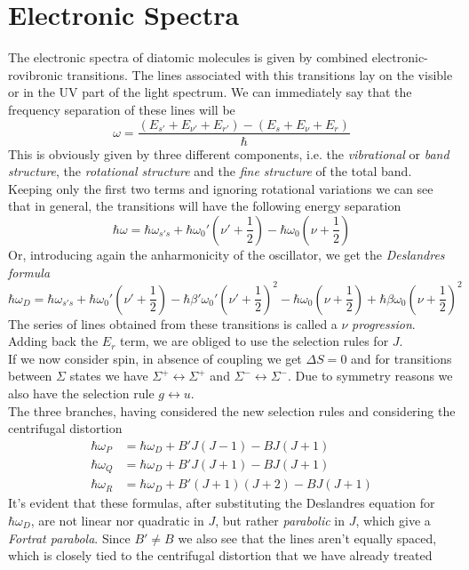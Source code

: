 \documentclass[../qm.tex]{subfiles}
\begin{document}
	\section{Electronic Spectra}
	The electronic spectra of diatomic molecules is given by combined electronic-rovibronic transitions. The lines associated with this transitions lay on the visible or in the UV part of the light spectrum. We can immediately say that the frequency separation of these lines will be
	\begin{equation}
		\omega=\frac{(E_{s'}+E_{\nu'}+E_{r'})-(E_s+E_\nu+E_r)}{\hbar}
		\label{eqelectronicspectra}
	\end{equation}
	This is obviously given by three different components, i.e. the \textit{vibrational} or \textit{band structure}, the \textit{rotational structure} and the \textit{fine structure} of the total band.\\
	Keeping only the first two terms and ignoring rotational variations we can see that in general, the transitions will have the following energy separation
	\begin{equation}
		\hbar\omega=\hbar\omega_{s's}+\hbar\omega_0'\left( \nu'+\frac{1}{2} \right)-\hbar\omega_0\left( \nu+\frac{1}{2} \right)
		\label{eq:electronicspectranorotation}
	\end{equation}
	Or, introducing again the anharmonicity of the oscillator, we get the \textit{Deslandres formula}
	\begin{equation}
		\hbar\omega_D=\hbar\omega_{s's}+\hbar\omega_0'\left( \nu'+\frac{1}{2} \right)-\hbar\beta'\omega_0'\left( \nu'+\frac{1}{2} \right)^2-\hbar\omega_0\left( \nu+\frac{1}{2} \right)+\hbar\beta\omega_0\left( \nu+\frac{1}{2} \right)^2
		\label{eq:Deslandresformula}
	\end{equation}
	The series of lines obtained from these transitions is called a $\nu$ \textit{progression}.\\
	Adding back the $E_r$ term, we are obliged to use the selection rules for $J$.\\
	If we now consider spin, in absence of coupling we get $\Delta S=0$ and for transitions between $\Sigma$ states we have $\Sigma^+\leftrightarrow\Sigma^+$ and $\Sigma^-\leftrightarrow\Sigma^-$. Due to symmetry reasons we also have the selection rule $g\leftrightarrow u$.\\
	The three branches, having considered the new selection rules and considering the centrifugal distortion
	\begin{equation}
		\begin{aligned}
			\hbar\omega_P&=\hbar\omega_D+B'J(J-1)-BJ(J+1)\\
			\hbar\omega_Q&=\hbar\omega_D+B'J(J+1)-BJ(J+1)\\
			\hbar\omega_R&=\hbar\omega_D+B'(J+1)(J+2)-BJ(J+1)
		\end{aligned}
		\label{eq:PQRsequence}
	\end{equation}
	It's evident that these formulas, after substituting the Deslandres equation for $\hbar\omega_D$, are not linear nor quadratic in $J$, but rather \textit{parabolic} in $J$, which give a \textit{Fortrat parabola}. Since $B'\ne B$ we also see that the lines aren't equally spaced, which is closely tied to the centrifugal distortion that we have already treated
\end{document}

